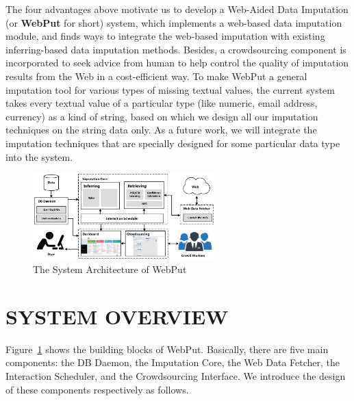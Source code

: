 \documentclass[sigconf]{acmart}
\begin{document}
The four advantages above motivate us to develop a Web-Aided Data Imputation (or {\bf WebPut} for short) system, which implements a web-based data imputation module, and finds ways to integrate the web-based imputation with existing inferring-based data imputation methods. Besides, a crowdsourcing component is incorporated to seek advice from human to help control the quality of imputation results from the Web in a cost-efficient way.
%
To make WebPut a general imputation tool for various types of missing textual values, the current system takes every textual value of a particular type (like numeric, email address, currency) as a kind of string, based on which we design all our imputation techniques on the string data only. As a future work, we will integrate the imputation techniques that are specially designed for some particular data type into the system.


%

\begin{figure}
  \centerline{\includegraphics[width=7cm]{images/Architecture.eps}}
  \caption{The System Architecture of WebPut}
  \label{fig:architecture}
\end{figure}


\section{SYSTEM  OVERVIEW}
Figure~\ref{fig:architecture} shows the building blocks of WebPut. Basically, there are  five main components: the DB Daemon, the Imputation Core, the Web Data Fetcher, the Interaction Scheduler, and the Crowdsourcing Interface. We introduce the design of these components respectively as follows.
\end{document}
